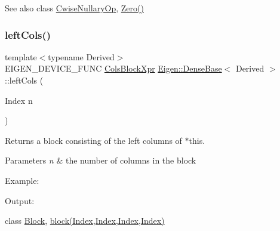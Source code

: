 \begin{DoxySeeAlso}{See also}
class \mbox{\hyperlink{class_eigen_1_1_cwise_nullary_op}{Cwise\+Nullary\+Op}}, \mbox{\hyperlink{class_eigen_1_1_dense_base_a8c4be762b10041d64a2b2ce85bb14ba0}{Zero()}} 
\end{DoxySeeAlso}
\mbox{\label{class_eigen_1_1_dense_base_a51dba0f45bdf7eef96043b318380054a}} 
\subsubsection{\texorpdfstring{leftCols()}{leftCols()}\hspace{0.1cm}{\footnotesize\ttfamily [1/2]}}
{\footnotesize\ttfamily template$<$typename Derived$>$ \\
E\+I\+G\+E\+N\+\_\+\+D\+E\+V\+I\+C\+E\+\_\+\+F\+U\+NC \mbox{\hyperlink{class_eigen_1_1_block}{Cols\+Block\+Xpr}} \mbox{\hyperlink{class_eigen_1_1_dense_base}{Eigen\+::\+Dense\+Base}}$<$ Derived $>$\+::left\+Cols (\begin{DoxyParamCaption}\item[{Index}]{n }\end{DoxyParamCaption})\hspace{0.3cm}{\ttfamily [inline]}}

\begin{DoxyReturn}{Returns}
a block consisting of the left columns of $\ast$this.
\end{DoxyReturn}

\begin{DoxyParams}{Parameters}
{\em n} & the number of columns in the block\\
\hline
\end{DoxyParams}
Example\+: 
\begin{DoxyCodeInclude}{0}
\end{DoxyCodeInclude}
 Output\+: 
\begin{DoxyVerbInclude}
\end{DoxyVerbInclude}
 class \mbox{\hyperlink{class_eigen_1_1_block}{Block}}, \mbox{\hyperlink{class_eigen_1_1_dense_base_ab8e42e67c5cfd5fa13e684642f0f65bf}{block(\+Index,\+Index,\+Index,\+Index)}} \mbox{\label{class_eigen_1_1_dense_base_a1f852444684ffa51ad205f66313c873f}} 
